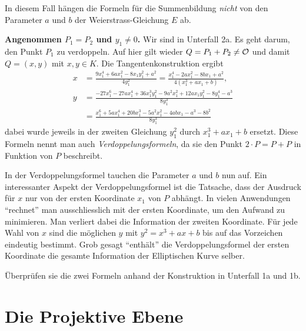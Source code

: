 In diesem Fall hängen die Formeln für die Summenbildung  \emph{nicht}
von den Parameter $a$ und $b$ der Weierstrass-Gleichung $E$ ab.  

\bigskip
\textbf{Angenommen $P_1=P_2$ und $y_1\not=0$.} Wir sind in Unterfall
2a. Es geht darum, den Punkt $P_1$ zu verdoppeln. Auf hier gilt wieder
$Q=P_1+P_2\not={\mathcal O}$ und damit $Q=(x,y)$ mit $x,y\in K$.
Die Tangentenkonstruktion ergibt 
\begin{equation}
  \label{eq:dupformula}
  \begin{aligned}
    x &= \frac{9x_1^4+6ax_1^2-8x_1y_1^2+a^2}{4y_1^2} = \frac{x_1^4 - 2ax_1^2 - 8bx_1 + a^2
    }{4(x_1^3+ax_1+b)},\\
    y &=
    \frac{-27x_1^6-27ax_1^4+36x_1^3y_1^2-9a^2x_1^2+12ax_1y_1^2-8y_1^4-a^3}{8y_1^3}\\
    & =\frac{x_1^6+ 5ax_1^4 + 20bx_1^3- 5a^2x_1^2 -4abx_1 -a^3 -8b^2 }{8y_1^3}
  \end{aligned}
\end{equation}
dabei wurde jeweils in der zweiten Gleichung  $y_1^2$ durch
$x_1^3+ax_1+b$ ersetzt.
Diese Formeln nennt man auch
\emph{Verdoppelungsformeln}, da sie den
Punkt $2\cdot P=P+P$ in Funktion von $P$ beschreibt.


In der Verdoppelungsformel tauchen die Parameter $a$ und $b$ nun auf. Ein interessanter
Aspekt der Verdoppelungsformel ist die Tatsache, dass der Ausdruck für
$x$ nur von der ersten Koordinate $x_1$ von $P$ abhängt. In vielen
Anwendungen ``rechnet'' man ausschliesslich mit der ersten Koordinate,
um den Aufwand zu minimieren. Man verliert dabei die Information der
zweiten Koordinate. Für jede Wahl von $x$ sind die möglichen $y$ mit 
$y^2 = x^3+ax+b$ bis auf das Vorzeichen eindeutig bestimmt. Grob
gesagt ``enthält'' die Verdoppelungsformel der ersten Koordinate die
gesamte Information der Elliptischen Kurve selber.

\begin{aufgabe}
  Überprüfen sie die zwei Formeln anhand der Konstruktion in Unterfall
  1a und 1b. 
\end{aufgabe}


\section{Die Projektive Ebene}
\label{sec:projektiv}

